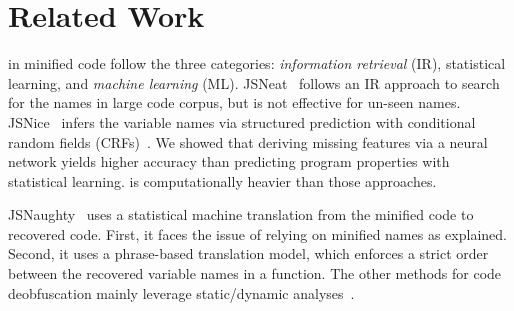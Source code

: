 \section{Related Work}
\label{related_section}


 in minified code
follow the three categories: {\em information retrieval} (IR),
statistical learning, and {\em machine learning} (ML).
JSNeat~\cite{icse19} follows an IR approach to search for the names in
large code corpus, but is not effective for un-seen names.
JSNice~\cite{JSNice2015}
infers the variable names via structured prediction with
conditional random fields (CRFs)~\cite{JSNice2015}. We showed that
deriving missing features via a neural network yields higher accuracy
than predicting program properties with statistical learning.
{\tool} is computationally heavier than those approaches.


JSNaughty~\cite{JSNaughty2017} uses a statistical machine
translation from the minified code to recovered code. First, it
faces the issue of relying on minified names as explained.
Second, it uses a phrase-based translation model, which
enforces a strict order between the recovered variable names in a
function.
The other methods for code deobfuscation mainly leverage
static/dynamic
analyses~\cite{Christodorescu:2003:SAE:1251353.1251365,Moser:2007:EME:1263552.1264210,Udupa05deobfuscation:reverse}.



